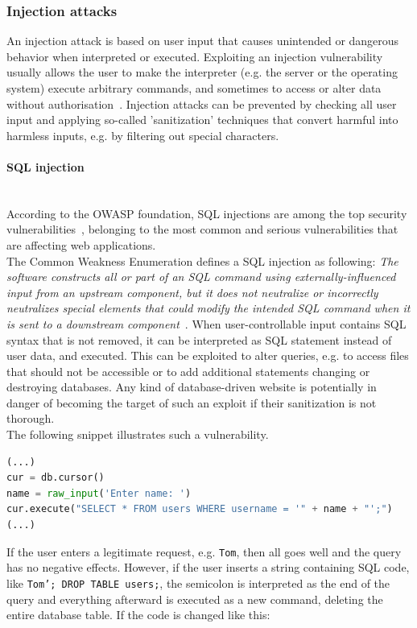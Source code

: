 \documentclass[
	a4paper,
	pagesize,
	pdftex,
	12pt,
	twoside, %
	BCOR=5mm, %
	ngerman,
	fleqn,
	final,
	]{scrartcl}
\begin{document}
\subsubsection{Injection attacks}
An injection attack is based on user input that causes unintended or dangerous behavior when interpreted or executed. Exploiting an injection vulnerability usually allows the user to make the interpreter (e.g. the server or the operating system) execute arbitrary commands, and sometimes to access or alter data without authorisation~\cite{Micheelsen.2016}. Injection attacks can be prevented by checking all user input and applying so-called 'sanitization' techniques that convert harmful into harmless inputs, e.g. by filtering out special characters. 
\paragraph{SQL injection}\mbox{}\\
According to the OWASP foundation, SQL injections are among the top security vulnerabilities~\cite{OWASPFoundation.}, belonging to the most common and serious vulnerabilities that are affecting web applications.\\ 
The Common Weakness Enumeration defines a SQL injection as following: \textit{The software constructs all or part of an SQL command using externally-influenced input from an upstream component, but it does not neutralize or incorrectly neutralizes special elements that could modify the intended SQL command when it is sent to a downstream component}~\cite{CommonWeaknessEnumeration.19.9.2019}. When user-controllable input contains SQL syntax that is not removed, it can be interpreted as SQL statement instead of user data, and executed. This can be exploited to alter queries, e.g. to access files that should not be accessible or to add additional statements changing or destroying databases. Any kind of database-driven website is potentially in danger of becoming the target of such an exploit if their sanitization is not thorough.\\
The following snippet illustrates such a vulnerability.
\begin{lstlisting}[language=Python,showstringspaces=false]
(...)
cur = db.cursor()
name = raw_input('Enter name: ')
cur.execute("SELECT * FROM users WHERE username = '" + name + "';")
(...)
\end{lstlisting}
If the user enters a legitimate request, e.g. \texttt{Tom}, then all goes well and the query has no negative effects. However, if the user inserts a string containing SQL code, like \texttt{Tom'; DROP TABLE users;}, the semicolon is interpreted as the end of the query and everything afterward is executed as a new command, deleting the entire database table. If the code is changed like this:
\end{document}
